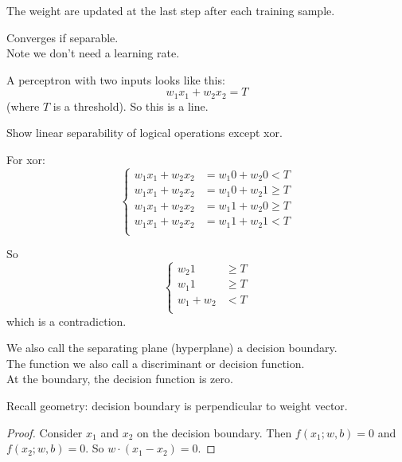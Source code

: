 The weight are updated at the last step after each training sample.

Converges if separable.\\
Note we don't need a learning rate.

A perceptron with two inputs looks like this:
\begin{displaymath}
  w_1 x_1 + w_2 x_2 = T
\end{displaymath}
(where $T$ is a threshold).  So this is a line.

Show linear separability of logical operations except xor.

For xor:
\begin{displaymath}
  \left\{
  \begin{array}{ll}
    w_1 x_1 + w_2 x_2 & = w_1 0 + w_2 0 < T \\
    w_1 x_1 + w_2 x_2 & = w_1 0 + w_2 1 \ge T \\
    w_1 x_1 + w_2 x_2 & = w_1 1 + w_2 0 \ge T \\
    w_1 x_1 + w_2 x_2 & = w_1 1 + w_2 1 < T \\
  \end{array} \right.
\end{displaymath}

So
\begin{displaymath}
  \left\{
  \begin{array}{ll}
     w_2 1 & \ge T \\
     w_1 1 & \ge T \\
     w_1 + w_2 & < T \\
  \end{array} \right.
\end{displaymath}
which is a contradiction.

\bigskip
We also call the separating plane (hyperplane) a decision boundary. \\
The function we also call a discriminant or decision function.\\
At the boundary, the decision function is zero.

Recall geometry: decision boundary is perpendicular to weight vector.

\begin{proof}
  Consider $x_1$ and $x_2$ on the decision boundary.  Then
  $f(x_1; w, b) = 0$ and $f(x_2; w, b) = 0$.  So
  $w\cdot (x_1 - x_2) = 0$.
\end{proof}



